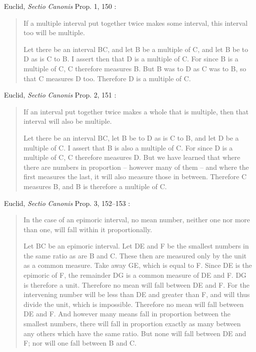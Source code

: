 \documentclass{amsart}
\theoremstyle{definition}
\begin{document}
Euclid, {\em Sectio Canonis} Prop. 1, 150 \cite[p.~194]{barker}:

\begin{quote}
If a multiple interval put together twice makes some
interval, this interval too will be multiple.

Let there be an interval BC, and let B be a multiple of C,
and let B be to D as is C to B. I assert then that D is a
multiple of C. For since B is a multiple of C, C therefore
measures B. But B was to D as C was to B, so that C
measures D too. Therefore D is a multiple of C.
\end{quote}

Euclid, {\em Sectio Canonis} Prop. 2, 151 \cite[p.~194]{barker}:

\begin{quote}
If an interval put together twice makes a whole that
is multiple, then that interval will also be multiple.

Let there be an interval BC, let B be to D as is C to B, and let D be a multiple
of C. I assert that B is also a multiple of C. For since D is a multiple of C, C
therefore measures D. But we have learned that where there are numbers in
proportion -- however many of them -- and where the first measures the last, it
will also measure those in between. Therefore C measures B, and B is therefore
a multiple of C.
\end{quote}

Euclid, {\em Sectio Canonis} Prop. 3, 152--153 \cite[p.~195]{barker}:

\begin{quote}
In the case of an epimoric interval, no mean number,
neither one nor more than one, will fall within it proportionally.

Let BC be an epimoric interval. Let DE and F be the smallest numbers in the
same ratio as are B and C. These then are measured only by the unit as a
common measure. Take away GE, which is equal to F. Since DE is the
epimoric of F, the remainder DG is a common measure of DE and F. DG is
therefore a unit. Therefore no mean will fall between DE and F. For the
intervening number will be less than DE and greater than F, and will thus divide
the unit, which is impossible. Therefore no mean will fall between DE and F.
And however many means fall in proportion between the smallest numbers,
there will fall in proportion exactly as many between any others which have the
same ratio. But none will fall between DE and F; nor will one fall between
B and C.
\end{quote}
\end{document}
